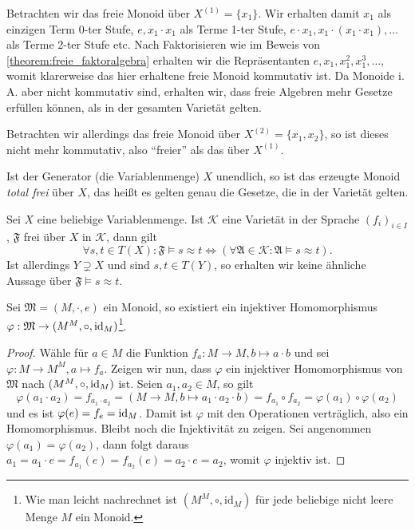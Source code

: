 \begin{remark}
    Betrachten wir das freie Monoid über $X^{(1)} = \{x_1\}$. Wir erhalten damit $x_1$ als einzigen Term 0-ter Stufe, $e, x_1 \cdot x_1$ als Terme 1-ter Stufe, $e \cdot x_1, x_1\cdot(x_1 \cdot x_1), \ldots$ als Terme 2-ter Stufe etc. Nach Faktorisieren wie im Beweis von \cref{theorem:freie_faktoralgebra} erhalten wir die Repräsentanten $e, x_1, x_1^2, x_1^3, \ldots$, womit klarerweise das hier erhaltene freie Monoid kommutativ ist. Da Monoide i. A. aber nicht kommutativ sind, erhalten wir, dass freie Algebren mehr Gesetze erfüllen können, als in der gesamten Varietät gelten. 
    
    Betrachten wir allerdings das freie Monoid über $X^{(2)} = \{x_1, x_2\}$, so ist dieses nicht mehr kommutativ, also ``freier'' als das über $X^{(1)}$. 

    Ist der Generator (die Variablenmenge) $X$ unendlich, so ist das erzeugte Monoid \emph{total frei} über $X$, das heißt es gelten genau die Gesetze, die in der Varietät gelten.
\end{remark}

\begin{remark}
   Sei $X$ eine beliebige Variablenmenge. Ist $\mathcal{K}$ eine Varietät in der Sprache $(f_i)_{i\in I}$, $\mathfrak{F}$ frei über $X$ in $\mathcal{K}$, dann gilt $$\forall s,t \in T(X): \mathfrak{F} \models s\approx t \Leftrightarrow \left(\forall \mathfrak{A} \in \mathcal{K}: \mathfrak{A} \models s \approx t\right).$$ 
    Ist allerdings $Y \supsetneq X$ und sind $s,t \in T(Y)$, so erhalten wir keine ähnliche Aussage über $\mathfrak{F} \models s \approx t$.
\end{remark}

\begin{theorem}\label{theorem:darstellungssatz-cayley-monoid}
    Sei $\mathfrak{M} = (M, \cdot, e)$ ein Monoid, so existiert ein injektiver Homomorphismus $\varphi: \mathfrak{M} \to (M^M, \circ, \operatorname{id}_M)$\footnote{Wie man leicht nachrechnet ist $(M^M,\circ,\mathrm{id}_M)$ für jede beliebige nicht leere Menge $M$ ein Monoid.}.
\end{theorem}
\begin{proof}
    Wähle für $a \in M$ die Funktion $f_a: M \to M, b \mapsto a \cdot b$ und sei $\varphi: M \to M^M, a \mapsto f_a$. Zeigen wir nun, dass $\varphi$ ein injektiver Homomorphismus von $\mathfrak{M}$ nach $(M^M, \circ, \operatorname{id}_M)$ ist. Seien $a_1, a_2 \in M$, so gilt $$\varphi(a_1 \cdot a_2) = f_{a_1 \cdot a_2} = (M \to M, b \mapsto a_1 \cdot a_2 \cdot b) = f_{a_1} \circ f_{a_2} = \varphi(a_1) \circ \varphi(a_2)$$
    und es ist $\varphi(e) = f_e = \operatorname{id}_M$. Damit ist $\varphi$ mit den Operationen verträglich, also ein Homomorphismus. Bleibt noch die Injektivität zu zeigen. Sei angenommen $\varphi(a_1) = \varphi(a_2)$, dann folgt daraus $a_1 = a_1 \cdot e = f_{a_1}(e) = f_{a_2}(e) = a_2 \cdot e = a_2$, womit $\varphi$ injektiv ist.
\end{proof}

